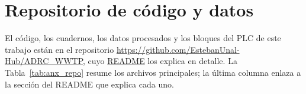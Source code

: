 \newcommand{\repourl}{https://github.com/EstebanUnal-Hub/ADRC_WWTP}
\newcommand{\repositorio}{\url{\repourl}}
\newcommand{\readme}[2]{\href{\repourl\##1}{#2}}

\chapter{Repositorio de código y datos}
\label{anx:st}
\label{anx:archivos}

El código, los cuadernos, los datos procesados y los bloques del PLC de este trabajo están en el
repositorio \repositorio, cuyo \href{\repourl}{README} los explica en detalle. La
Tabla~\ref{tab:anx_repo} resume los archivos principales; la última columna enlaza a la sección del
README que explica cada uno.


